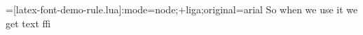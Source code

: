 \documentclass{article}
\begin{document}

\font\testluafont=[latex-font-demo-rule.lua]:mode=node;+liga;original=arial
{\testluafont So when we use it we get text ffi}

 

%
\end{document}
